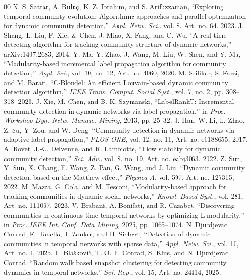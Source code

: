 \documentclass[conference]{IEEEtran}
\theoremstyle{definition}
\begin{document}
\begin{thebibliography}{00}
    N. S. Sattar, A. Bulu{\c c}, K. Z. Ibrahim, and S. Arifuzzaman, ``Exploring temporal community evolution: Algorithmic approaches and parallel optimization for dynamic community detection,'' \textit{Appl. Netw. Sci.}, vol. 8, Art. no. 64, 2023.
    J. Shang, L. Liu, F. Xie, Z. Chen, J. Miao, X. Fang, and C. Wu, ``A real-time detecting algorithm for tracking community structure of dynamic networks,'' arXiv:1407.2683, 2014.
    Y. Ma, Y. Zhao, J. Wang, M. Liu, W. Shen, and Y. Ma, ``Modularity-based incremental label propagation algorithm for community detection,'' \textit{Appl. Sci.}, vol. 10, no. 12, Art. no. 4060, 2020.
    M. Seifikar, S. Farzi, and M. Barati, ``C-Blondel: An efficient Louvain-based dynamic community detection algorithm,'' \textit{IEEE Trans. Comput. Social Syst.}, vol. 7, no. 2, pp. 308--318, 2020.
    J. Xie, M. Chen, and B. K. Szymanski, ``LabelRankT: Incremental community detection in dynamic networks via label propagation,'' in \textit{Proc. Workshop Dyn. Netw. Manage. Mining}, 2013, pp. 25--32.
    J. Han, W. Li, L. Zhao, Z. Su, Y. Zou, and W. Deng, ``Community detection in dynamic networks via adaptive label propagation,'' \textit{PLOS ONE}, vol. 12, no. 11, Art. no. e0188655, 2017.
    A. Bovet, J.-C. Delvenne, and R. Lambiotte, ``Flow stability for dynamic community detection,'' \textit{Sci. Adv.}, vol. 8, no. 19, Art. no. eabj3063, 2022.
    Z. Sun, Y. Sun, X. Chang, F. Wang, Z. Pan, G. Wang, and J. Liu, ``Dynamic community detection based on the Matthew effect,'' \textit{Physica A}, vol. 597, Art. no. 127315, 2022.
    M. Mazza, G. Cola, and M. Tesconi, ``Modularity-based approach for tracking communities in dynamic social networks,'' \textit{Knowl.-Based Syst.}, vol. 281, Art. no. 111067, 2023.
    V. Brabant, A. Bonifati, and R. Cazabet, ``Discovering communities in continuous-time temporal networks by optimizing L-modularity,'' in \textit{Proc. IEEE Int. Conf. Data Mining}, 2025, pp. 1065--1074.
    N. Djurdjevac Conrad, E. Tonello, J. Zonker, and H. Siebert, ``Detection of dynamic communities in temporal networks with sparse data,'' \textit{Appl. Netw. Sci.}, vol. 10, Art. no. 1, 2025.
    F. Bla{\v s}kovi{\'c}, T. O. F. Conrad, S. Klus, and N. Djurdjevac Conrad, ``Random walk based snapshot clustering for detecting community dynamics in temporal networks,'' \textit{Sci. Rep.}, vol. 15, Art. no. 24414, 2025.

\end{thebibliography}
\end{document}
